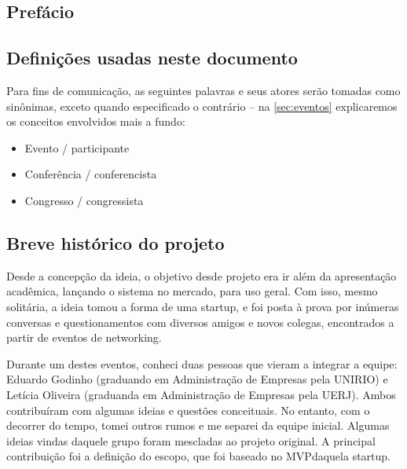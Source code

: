 \documentclass[12pt,a4paper,twoside,hyphens,english,brazil]{abntex2}
\begin{document}
\frenchspacing %

\imprimircapa
\imprimirfolhaderosto


\begin{KeepFromToc}
\tableofcontents

\chapter*{Prefácio}
\section*{Definições usadas neste documento}
Para fins de comunicação, as seguintes palavras e seus atores serão tomadas como sinônimas, exceto quando especificado o contrário -- na \autoref{sec:eventos} explicaremos os conceitos envolvidos mais a fundo:
\begin{itemize}[itemsep=-1ex]
	\item Evento / participante
	\item Conferência / conferencista
	\item Congresso / congressista
\end{itemize}


\section*{Breve histórico do projeto}
Desde a concepção da ideia, o objetivo desde projeto era ir além da apresentação acadêmica, lançando o sistema no mercado, para uso geral. Com isso, mesmo solitária, a ideia tomou a forma de uma startup, e foi posta à prova por inúmeras conversas e questionamentos com diversos amigos e novos colegas, encontrados a partir de eventos de networking.

Durante um destes eventos, conheci duas pessoas que vieram a integrar a equipe: Eduardo Godinho (graduando em Administração de Empresas pela UNIRIO) e Letícia Oliveira (graduanda em Administração de Empresas pela UERJ). Ambos contribuíram com algumas ideias e questões conceituais. No entanto, com o decorrer do tempo, tomei outros rumos e me separei da equipe inicial. Algumas ideias vindas daquele grupo foram mescladas ao projeto original. A principal contribuição foi a definição do escopo, que foi baseado no MVP\footnotemark daquela startup.


\end{KeepFromToc}
\end{document}
